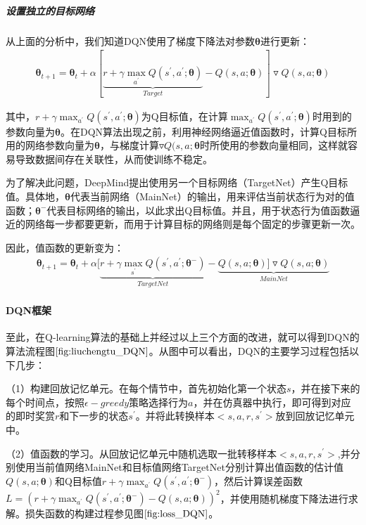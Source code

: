  \subparagraph{设置独立的目标网络}
从上面的分析中，我们知道DQN使用了梯度下降法对参数$\bm{\theta}$进行更新：
\begin{equation}
\begin{aligned}
\bm{\theta}_{t+1}=\bm{\theta}_{t}+\alpha[\underbrace{r+\gamma \max_{a^{'}}Q(s^{'},a^{'};\bm{\theta})}_{Target}-Q(s,a;\bm{\theta})]\triangledown Q(s,a;\bm{\theta})
\end{aligned}
\end{equation}

其中，$r+\gamma \max_{a^{'}}Q(s^{'},a^{'};\bm{\theta})$为Q目标值，在计算$\max_{a^{'}}Q(s^{'},a^{'};\bm{\theta})$时用到的参数向量为$\bm{\theta}$。在DQN算法出现之前，利用神经网络逼近值函数时，计算Q目标所用的网络参数向量为$\bm{\theta}$，与梯度计算$\triangledown Q(s,a;\bm{\theta}$时所使用的参数向量相同，这样就容易导致数据间存在关联性，从而使训练不稳定。

为了解决此问题，DeepMind提出使用另一个目标网络（TargetNet）产生Q目标值。具体地，$\bm{\theta}$代表当前网络（MainNet）的输出，用来评估当前状态行为对的值函数；$\bm{\theta}^{-}$代表目标网络的输出，以此求出Q目标值。并且，用于状态行为值函数逼近的网络每一步都要更新，而用于计算目标的网络则是每个固定的步骤更新一次。

因此，值函数的更新变为：
\begin{equation}
\begin{aligned}
\bm{\theta}_{t+1}=\bm{\theta}_{t}+\alpha[\underbrace{r+\gamma \max_{s^{'}}Q(s^{'},a^{'};\bm{\theta}^{-})}_{TargetNet}-\underbrace{Q(s,a;\bm{\theta})]\triangledown Q(s,a;\bm{\theta})}_{MainNet}
\end{aligned}
\end{equation}

 \paragraph{DQN框架}
 至此，在Q-learning算法的基础上并经过以上三个方面的改进，就可以得到DQN的算法流程图$\ref{fig:liuchengtu_DQN}$。从图中可以看出，DQN的主要学习过程包括以下几步：

（1）构建回放记忆单元。在每个情节中，首先初始化第一个状态$s$，并在接下来的每个时间点，按照$\epsilon-greedy$策略选择行为$a$，并在仿真器中执行，即可得到对应的即时奖赏$r$和下一步的状态$s^{'}$。并将此转换样本$<s,a,r,s^{'}>$放到回放记忆单元中。

（2）值函数的学习。从回放记忆单元中随机选取一批转移样本$<s,a,r,s^{'}>$,并分别使用当前值网络MainNet和目标值网络TargetNet分别计算出值函数的估计值 $Q(s,a;\bm{\theta})$和Q目标值$r+\gamma \max_{a^{'}}Q(s^{'},a^{'};\bm{\theta}^{-})$，然后计算误差函数$L=(r+\gamma \max_{a^{'}}Q(s^{'},a^{'};\bm{\theta}^{-})-Q(s,a;\bm{\theta}))^{2}$，并使用随机梯度下降法进行求解。损失函数的构建过程参见图$\ref{fig:loss_DQN}$。

